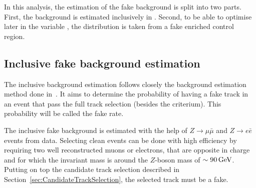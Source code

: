 In this analysis, the estimation of the fake background is split into two parts.
First, the background is estimated inclusively in \ias.
Second, to be able to optimise later in the variable \ias, the \ias distribution is taken from a fake enriched control region.

\subsection*{Inclusive fake background estimation}
The inclusive background estimation follows closely the background estimation method done in~\cite{bib:CMS:DT_Thesis,bib:CMS:DT_8TeV_AN}.
It aims to determine the probability of having a fake track in an event that pass the full track selection (besides the \ias criterium).
This probability will be called the fake rate.

The inclusive fake background is estimated with the help of $Z\rightarrow\mu\bar{\mu}$ and $Z\rightarrow e\bar{e}$ events from data.
Selecting clean \Zlep events can be done with high efficiency by requiring two well reconstructed muons or electrons, that are opposite in charge and for which the invariant mass is around the $Z$-boson mass of $\sim90\,\text{Ge}\kern-0.06667em\text{V}$.
Putting on top the candidate track selection described in Section~\ref{sec:CandidateTrackSelection}, the selected track must be a fake.


